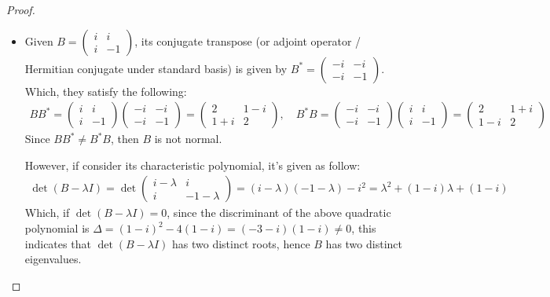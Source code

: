 \documentclass{article}
\begin{document}
\begin{proof}
\begin{itemize}
        \item[2.] Given $B=\begin{pmatrix}
            i&i\\i&-1
        \end{pmatrix}$, its conjugate transpose (or adjoint operator / Hermitian conjugate under standard basis) is given by $B^* = \begin{pmatrix}
            -i&-i\\-i&-1
        \end{pmatrix}$. Which, they satisfy the following:
        \begin{align}
            BB^* = \begin{pmatrix}
            i&i\\i&-1
        \end{pmatrix}\begin{pmatrix}
            -i&-i\\-i&-1
        \end{pmatrix} = \begin{pmatrix}
            2 & 1-i\\1+i & 2
        \end{pmatrix},\quad B^*B= \begin{pmatrix}
            -i&-i\\-i&-1
        \end{pmatrix}\begin{pmatrix}
            i&i\\i&-1
        \end{pmatrix}= \begin{pmatrix}
            2 & 1+i\\1-i&2
        \end{pmatrix}
        \end{align}
        Since $BB^*\neq B^*B$, then $B$ is not normal.

        However, if consider its characteristic polynomial, it's given as follow:
        \begin{align}
            \det(B-\lambda I) = \det\begin{pmatrix}
                i-\lambda & i\\i & -1-\lambda
            \end{pmatrix}=(i-\lambda)(-1-\lambda)-i^2 = \lambda^2+(1-i)\lambda+(1-i)
        \end{align}
        Which, if $\det(B-\lambda I)=0$, since the discriminant of the above quadratic polynomial is $\Delta = (1-i)^2 - 4(1-i) = (-3-i)(1-i) \neq 0$, this indicates that $\det(B-\lambda I)$ has two distinct roots, hence $B$ has two distinct eigenvalues. 


\end{itemize}
\end{proof}
\end{document}
